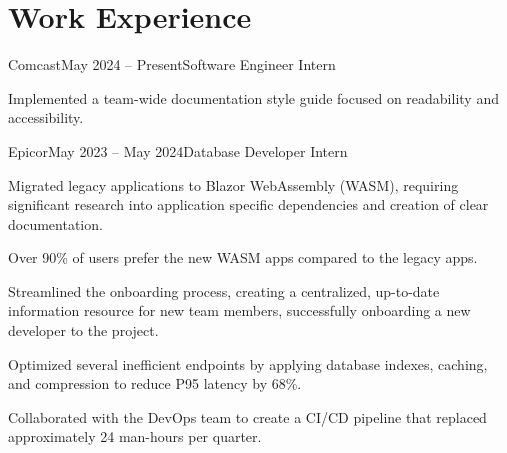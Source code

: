 \documentclass[letterpaper,11pt]{article}
\begin{document}
\section{Work Experience}
\begin{entries}
    \item\begin{experience}{Comcast}{May 2024 -- Present}{Software Engineer Intern}{}
        \item Implemented a team-wide documentation style guide focused on
            readability and accessibility.
    \end{experience}

    \item\begin{experience}{Epicor}{May 2023 -- May 2024}{Database Developer Intern}{}
        \item Migrated legacy applications to Blazor WebAssembly (WASM), requiring
            significant research into application specific dependencies and
            creation of clear documentation.
        \item Over 90\% of users prefer the new WASM apps compared to the legacy
            apps.
        \item Streamlined the onboarding process, creating a centralized,
            up-to-date information resource for new team members, successfully
            onboarding a new developer to the project.
        \item Optimized several inefficient endpoints by applying database indexes,
            caching, and compression to reduce P95 latency by 68\%.
        \item Collaborated with the DevOps team to create a CI/CD pipeline that
            replaced approximately 24 man-hours per quarter.
    \end{experience}
\end{entries}


\end{document}
